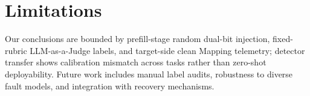 \section{Limitations}
\label{app:limitations}

Our conclusions are bounded by prefill-stage random dual-bit injection, fixed-rubric LLM-as-a-Judge labels, and target-side clean Mapping telemetry; detector transfer shows calibration mismatch across tasks rather than zero-shot deployability. Future work includes manual label audits, robustness to diverse fault models, and integration with recovery mechanisms.

